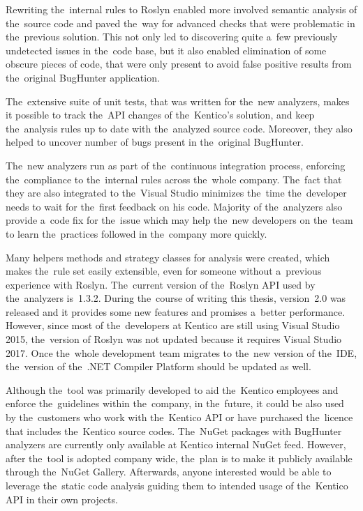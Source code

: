 \documentclass[
  digital, %
  table,   %
  lof,     %
  lot,     %
  oneside,
]{fithesis3}
\begin{document}
Rewriting the~internal rules to Roslyn enabled more involved semantic analysis of the~source code and paved the~way for advanced checks that were problematic in the~previous solution. This not only led to discovering quite a~few previously undetected issues in the~code base, but it also enabled elimination of some obscure pieces of code, that were only present to avoid false positive results from the~original BugHunter application. 

The~extensive suite of unit tests, that was written for the~new analyzers, makes it possible to track the~API changes of the~Kentico's solution, and keep the~analysis rules up to date with the~analyzed source code. Moreover, they also helped to uncover number of bugs present in the~original BugHunter.

The~new analyzers run as part of the~continuous integration process, enforcing the~compliance to the~internal rules across the~whole company. The~fact that they are also integrated to the~Visual Studio minimizes the~time the~developer needs to wait for the~first feedback on his code. Majority of the~analyzers also provide a~code fix for the~issue which may help the~new developers on the~team to learn the~practices followed in the~company more quickly.

Many helpers methods and strategy classes for analysis were created, which makes the~rule set easily extensible, even for someone without a~previous experience with Roslyn. The~current version of the~Roslyn API used by the~analyzers is~1.3.2. During the~course of writing this thesis, version~2.0 was released and it provides some new features and promises a~better performance. However, since most of the~developers at Kentico are still using Visual Studio 2015, the~version of Roslyn was not updated because it requires Visual Studio 2017. Once the~whole development team migrates to the~new version of the~IDE, the~version of the~.NET Compiler Platform should be updated as well.

Although the~tool was primarily developed to aid the~Kentico employees and enforce the~guidelines within the~company, in the~future, it could be also used by the~customers who work with the~Kentico API or have purchased the~licence that includes the~Kentico source codes. The~NuGet packages with BugHunter analyzers are currently only available at Kentico internal NuGet feed. However, after the~tool is adopted company wide, the~plan is to make it publicly available through the~NuGet Gallery. Afterwards, anyone interested would be able to leverage the~static code analysis guiding them to intended usage of the~Kentico API in their own projects.
\end{document}
